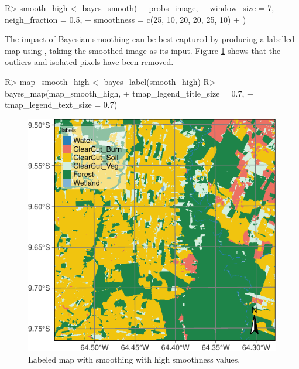 \documentclass[
  shortnames]{jss}
\begin{document}
\begin{CodeChunk}
\begin{CodeInput}
R> smooth_high <- bayes_smooth(
+     probs_image,
+     window_size = 7,
+     neigh_fraction = 0.5,
+     smoothness = c(25, 10, 20, 20, 25, 10)
+ )
\end{CodeInput}
\end{CodeChunk}

The impact of Bayesian smoothing can be best captured by producing a labelled map using , taking the smoothed image as its input. Figure \ref{fig:smth1} shows that the outliers and isolated pixels have been removed.

\begin{CodeChunk}
\begin{CodeInput}
R> map_smooth_high <- bayes_label(smooth_high)
R> bayes_map(map_smooth_high,
+           tmap_legend_title_size = 0.7,
+           tmap_legend_text_size = 0.7)
\end{CodeInput}
\begin{figure}[h]

{\centering \includegraphics{Bayesian_smoothing_JSS_files/figure-latex/smth1-1} 

}

\caption[Labeled map with smoothing with high smoothness values]{Labeled map with smoothing with high smoothness values.}\label{fig:smth1}
\end{figure}
\end{CodeChunk}
\end{document}
